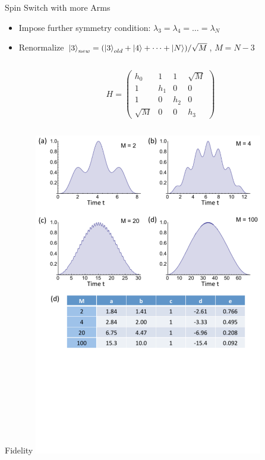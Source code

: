 \documentclass{beamer}
\begin{document}
\begin{frame}{Spin Switch with more Arms}
			\begin{itemize}
			\item Impose further symmetry condition: $\lambda_3 = \lambda_4 = \dots = \lambda_N$
			\item Renormalize $\ket{3}_{new}=(\ket{3}_{old} + \ket{4} + \dots + \ket{N})/\sqrt{M}$, $M=N-3$
			\end{itemize}
	\begin{columns}[T]
		\begin{column}{0.5\textwidth}
   			\centering
		\end{column}
		\begin{column}{0.5\textwidth}
			\centering
    		$H = \begin{pmatrix}
			h_0 & 1 & 1 & \sqrt{M} \\
			1 & h_1 & 0 & 0 \\
			1 & 0 & h_2 & 0 \\
			\sqrt{M} & 0 & 0 & h_3
\end{pmatrix}$
		\end{column}
	\end{columns}
\end{frame}

\begin{frame}{Fidelity}
	\centering
	\includegraphics[trim=0mm 0 0 0mm, width=0.75\textwidth]{Images/switch_fidelities}
\end{frame}
\end{document}
